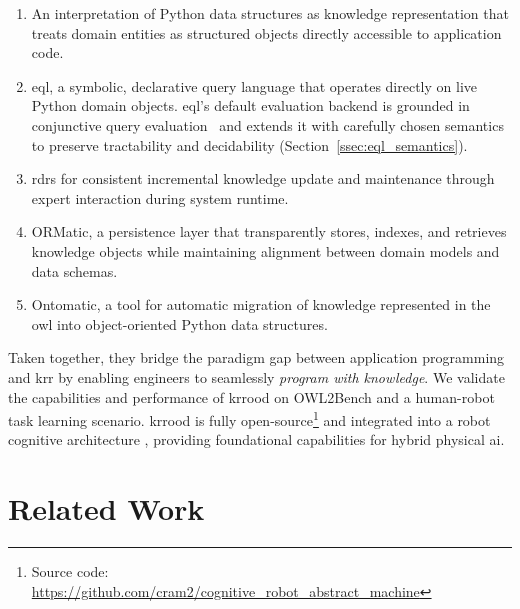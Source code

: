 \documentclass[a4paper,fleqn]{cas-sc}
\begin{document}
\begin{enumerate}
\item An interpretation of Python data structures as knowledge representation that treats domain entities as structured objects directly accessible to application code.

\item \acf{eql}, a symbolic, declarative query language that operates
directly on live Python domain objects. \ac{eql}'s default evaluation backend is grounded in conjunctive query
evaluation~\citep{ChandraMerlin1977,AbiteboulHullVianu1995} and extends it with carefully chosen semantics to preserve tractability and decidability (Section~\ref{ssec:eql_semantics}).

\item \Acp{rdr} for consistent incremental knowledge update and maintenance through expert interaction during system runtime.

\item ORMatic, a persistence layer that transparently stores, indexes, and retrieves knowledge objects while maintaining alignment between domain models and data schemas.

\item Ontomatic, a tool for automatic migration of knowledge represented in the \ac{owl} into object-oriented Python data structures.
\end{enumerate}

Taken together, they bridge the paradigm gap between application programming and \ac{krr} by enabling engineers to seamlessly \textit{program with knowledge}.
We validate the capabilities and performance of \ac{krrood} on OWL2Bench \citep{singh2020owl2bench} and a human-robot task learning scenario. \ac{krrood} is fully open-source\footnote{Source code: \url{https://github.com/cram2/cognitive_robot_abstract_machine}} and integrated into a robot cognitive architecture \citep{beetz2025robot}, providing foundational capabilities for hybrid physical \ac{ai}.

\section{Related Work}
\label{sec:related-work}
\end{document}
